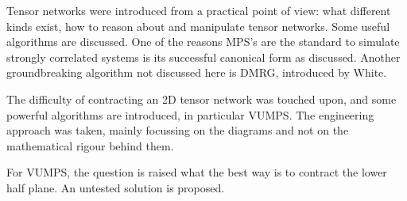 Tensor networks were introduced from a practical point of view: what different kinds exist, how to reason about and manipulate tensor networks. Some useful algorithms are discussed. One of the reasons MPS's are the standard to simulate strongly correlated systems is its successful canonical form as discussed. Another groundbreaking algorithm not discussed here is DMRG, introduced by White.

The difficulty of contracting an 2D tensor network was touched upon, and some powerful algorithms are introduced, in particular VUMPS. The engineering approach was taken, mainly focussing on the diagrams and not on the mathematical rigour behind them.

For VUMPS, the question is raised what the best way is to contract the lower half plane. An untested solution is proposed.